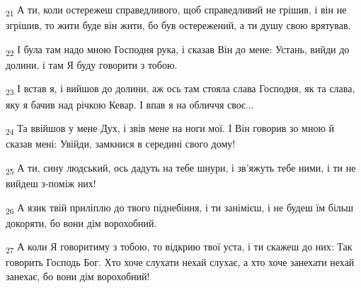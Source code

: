 \begin{tcolorbox}
\textsubscript{21} А ти, коли остережеш справедливого, щоб справедливий не грішив, і він не згрішив, то жити буде він жити, бо був остережений, а ти душу свою врятував.
\end{tcolorbox}
\begin{tcolorbox}
\textsubscript{22} І була там надо мною Господня рука, і сказав Він до мене: Устань, вийди до долини, і там Я буду говорити з тобою.
\end{tcolorbox}
\begin{tcolorbox}
\textsubscript{23} І встав я, і вийшов до долини, аж ось там стояла слава Господня, як та слава, яку я бачив над річкою Кевар. І впав я на обличчя своє...
\end{tcolorbox}
\begin{tcolorbox}
\textsubscript{24} Та ввійшов у мене Дух, і звів мене на ноги мої. І Він говорив зо мною й сказав мені: Увійди, замкнися в середині свого дому!
\end{tcolorbox}
\begin{tcolorbox}
\textsubscript{25} А ти, сину людський, ось дадуть на тебе шнури, і зв'яжуть тебе ними, і ти не вийдеш з-поміж них!
\end{tcolorbox}
\begin{tcolorbox}
\textsubscript{26} А язик твій приліплю до твого піднебіння, і ти занімієш, і не будеш їм більш докоряти, бо вони дім ворохобний.
\end{tcolorbox}
\begin{tcolorbox}
\textsubscript{27} А коли Я говоритиму з тобою, то відкрию твої уста, і ти скажеш до них: Так говорить Господь Бог. Хто хоче слухати нехай слухає, а хто хоче занехати нехай занехає, бо вони дім ворохобний!
\end{tcolorbox}
